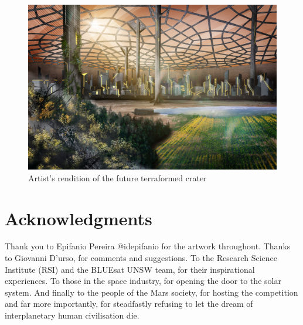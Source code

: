 \documentclass[fleqn,10pt]{Stylesheet} %
\begin{document}
\begin{figure}
    \centering
    \includegraphics[width=\linewidth]{art/terraformed_dome.jpg}
    \caption{Artist's rendition of the future terraformed crater}
    \label{fig:final_dome}
\end{figure}

\section*{Acknowledgments} %
Thank you to Epifanio Pereira @id\textunderscore epifanio for the artwork throughout. Thanks to Giovanni D'urso, for comments and suggestions. To the Research Science Institute (RSI) and the BLUEsat UNSW team, for their inspirational experiences. To those in the space industry, for opening the door to the solar system. And finally to the people of the Mars society, for hosting the competition and far more importantly, for steadfastly refusing to let the dream of interplanetary human civilisation die.




\end{document}
